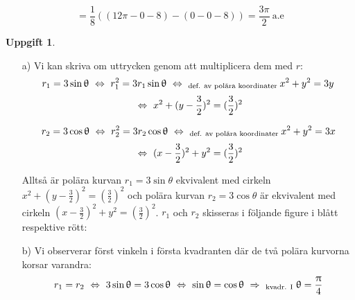 \documentclass{article}
\newtheorem{thr}{Uppgift}
\begin{document}
$$
=
\frac{1}{8}
((12\pi-0-8)-(0-0-8))
= 
\frac{3\pi}{2} \: \text{a.e}
$$

\newpage

\begin{thr}
\end{thr}

\begin{enumerate}
    \item[a)] Vi kan skriva om uttrycken genom att multiplicera dem med $r$:
        $$
        r_1=3\mathop\mathrm{sin}\nolimits\uptheta 
        \ \Leftrightarrow \ 
        r_{1}^2=3r_{1}\mathop\mathrm{sin}\nolimits\uptheta
        \ \Leftrightarrow \ _{\text{def. av polära koordinater}}
        \:
        x^2+y^2=3y
        $$
        $$
        \ \Leftrightarrow \ 
        x^2+(y-\frac{3}{2})^2=(\frac{3}{2})^2
        $$

        $$
        r_2=3\mathop\mathrm{cos}\nolimits\uptheta 
        \ \Leftrightarrow \ 
        r_{2}^2=3r_{2}\mathop\mathrm{cos}\nolimits\uptheta
        \ \Leftrightarrow \ _{\text{def. av polära koordinater}}
        \:
        x^2+y^2=3x
        $$
        $$
        \ \Leftrightarrow \ 
        (x-\frac{3}{2})^2+y^2=(\frac{3}{2})^2
        $$

        \vskip 0.3cm

        Alltså är polära kurvan $r_{1}=3\sin\theta$ ekvivalent med cirkeln $x^2+(y-\frac{3}{2})^2=(\frac{3}{2})^2$ och polära kurvan $r_{2}=3\cos\theta$ är ekvivalent med cirkeln $(x-\frac{3}{2})^2+y^2=(\frac{3}{2})^2$. $r_{1}$ och $r_{2}$ skisseras i följande figure i blått respektive rött:

        \begin{figure}[h]
            \center
        \end{figure}

    \item[b)] Vi observerar först vinkeln i första kvadranten där de två polära kurvorna korsar varandra:
        $$
        r_{1}=r_{2}
        \ \Leftrightarrow \ 
        3\mathop\mathrm{sin}\nolimits\uptheta=3\mathop\mathrm{cos}\nolimits\uptheta
        \ \Leftrightarrow \ 
        \mathop\mathrm{sin}\nolimits\uptheta=\mathop\mathrm{cos}\nolimits\uptheta
        \ \Rightarrow \ _{\text{kvadr. I}}
        \;
        \uptheta=\frac{\uppi}{4}
        $$


\end{enumerate}
\end{document}
